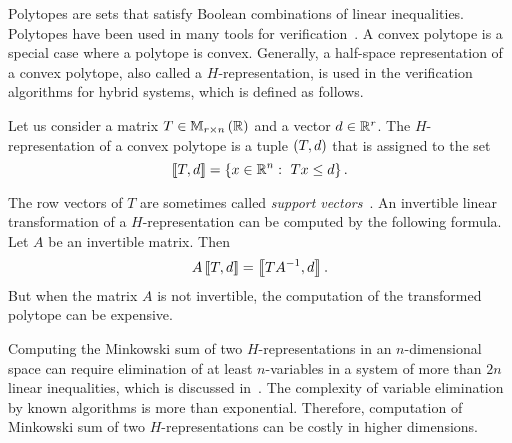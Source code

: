 Polytopes are sets that satisfy Boolean combinations of linear
inequalities.  Polytopes have been used in many tools for
verification~\cite{kvasnica2004multi,silva2000modeling,asarin2002d,bagnara2008parma,frehse2008phaver}.  A
convex polytope is a special case where a polytope is convex.
Generally, a half-space representation of a convex polytope, also
called a $H$-representation, is used in the verification algorithms
for hybrid systems, which is defined as follows.






%
\begin{definition}[$H$-representation]
Let us consider a matrix $T\in\mathbb{M}_{r\times n}\left(\mathbb{R}\right)$ and a vector $d\in\mathbb{R}^r$.
The $H$-representation of a convex polytope is a tuple $\left(T,d\right)$
that is assigned to the set
%
\[
\left\llbracket T,d\right\rrbracket=\left\{x\in\mathbb{R}^n:~Tx\leq d\right\}.
\]
%
\end{definition}
%
The row vectors of $T$ are sometimes called \emph{support vectors}~\cite{FLD+11}.
An invertible linear transformation of a $H$-representation can be
computed by the following formula.  Let $A$ be an invertible matrix.
Then
%
\[
A\left\llbracket T,d\right\rrbracket=\left\llbracket TA^{-1},d\right\rrbracket.
\]
%
But when the matrix $A$ is not invertible, the computation of the
transformed polytope can be expensive.

Computing the Minkowski sum of
two $H$-representations in an $n$-dimensional
space can require elimination of at least $n$-variables in a system of
more than $2n$ linear inequalities, which is discussed
in~\cite{kvasnica2005minkowski}.  The complexity of variable
elimination by known algorithms is more than exponential.  Therefore,
computation of Minkowski sum of two $H$-representations can be costly
in higher dimensions.

